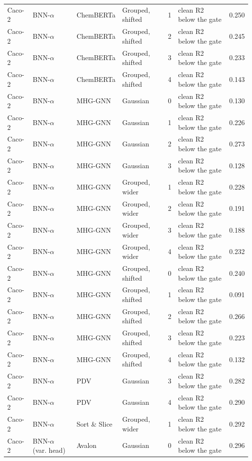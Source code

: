 {\begin{longtable}{llllcll}
Caco-2 & BNN-$\alpha$ & ChemBERTa & Grouped, shifted & 1 & clean R2 below the gate & 0.250 \\
Caco-2 & BNN-$\alpha$ & ChemBERTa & Grouped, shifted & 2 & clean R2 below the gate & 0.245 \\
Caco-2 & BNN-$\alpha$ & ChemBERTa & Grouped, shifted & 3 & clean R2 below the gate & 0.233 \\
Caco-2 & BNN-$\alpha$ & ChemBERTa & Grouped, shifted & 4 & clean R2 below the gate & 0.143 \\
Caco-2 & BNN-$\alpha$ & MHG-GNN & Gaussian & 0 & clean R2 below the gate & 0.130 \\
Caco-2 & BNN-$\alpha$ & MHG-GNN & Gaussian & 1 & clean R2 below the gate & 0.226 \\
Caco-2 & BNN-$\alpha$ & MHG-GNN & Gaussian & 2 & clean R2 below the gate & 0.273 \\
Caco-2 & BNN-$\alpha$ & MHG-GNN & Gaussian & 3 & clean R2 below the gate & 0.128 \\
Caco-2 & BNN-$\alpha$ & MHG-GNN & Grouped, wider & 1 & clean R2 below the gate & 0.228 \\
Caco-2 & BNN-$\alpha$ & MHG-GNN & Grouped, wider & 2 & clean R2 below the gate & 0.191 \\
Caco-2 & BNN-$\alpha$ & MHG-GNN & Grouped, wider & 3 & clean R2 below the gate & 0.188 \\
Caco-2 & BNN-$\alpha$ & MHG-GNN & Grouped, wider & 4 & clean R2 below the gate & 0.232 \\
Caco-2 & BNN-$\alpha$ & MHG-GNN & Grouped, shifted & 0 & clean R2 below the gate & 0.240 \\
Caco-2 & BNN-$\alpha$ & MHG-GNN & Grouped, shifted & 1 & clean R2 below the gate & 0.091 \\
Caco-2 & BNN-$\alpha$ & MHG-GNN & Grouped, shifted & 2 & clean R2 below the gate & 0.266 \\
Caco-2 & BNN-$\alpha$ & MHG-GNN & Grouped, shifted & 3 & clean R2 below the gate & 0.223 \\
Caco-2 & BNN-$\alpha$ & MHG-GNN & Grouped, shifted & 4 & clean R2 below the gate & 0.132 \\
Caco-2 & BNN-$\alpha$ & PDV & Gaussian & 3 & clean R2 below the gate & 0.282 \\
Caco-2 & BNN-$\alpha$ & PDV & Gaussian & 4 & clean R2 below the gate & 0.290 \\
Caco-2 & BNN-$\alpha$ & Sort \& Slice & Grouped, wider & 1 & clean R2 below the gate & 0.292 \\
Caco-2 & BNN-$\alpha$ (var. head) & Avalon & Gaussian & 0 & clean R2 below the gate & 0.296 \\

\end{longtable}}
